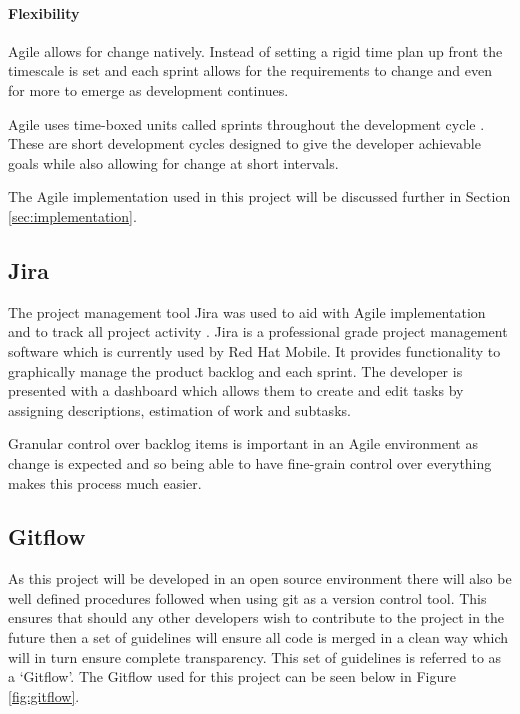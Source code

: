 \paragraph{Flexibility} Agile allows for change natively. Instead of setting a rigid time plan up front the timescale is set and each \gls{sprint} allows for the requirements to change and even for more to emerge as development continues.

Agile uses time-boxed units called \glspl{sprint} throughout the development cycle \citep{Agile2016}. These are short development cycles designed to give the developer achievable goals while also allowing for change at short intervals.

The Agile implementation used in this project will be discussed further in Section \ref{sec:implementation}.

\subsection{Jira}
\label{sub:jira}
The project management tool Jira was used to aid with Agile implementation and to track all project activity \citep{JBoss2016}. Jira is a professional grade project management software which is currently used by Red Hat Mobile. It provides functionality to graphically manage the product backlog and each \gls{sprint}. The developer is presented with a dashboard which allows them to create and edit tasks by assigning descriptions, estimation of work and subtasks.

Granular control over backlog items is important in an Agile environment as change is expected and so being able to have fine-grain control over everything makes this process much easier.
\subsection{Gitflow}
\label{sub:gitflow}
As this project will be developed in an open source environment there will also be well defined procedures followed when using \gls{git} as a version control tool. This ensures that should any other developers wish to contribute to the project in the future then a set of guidelines will ensure all code is merged in a clean way which will in turn ensure complete transparency. This set of guidelines is referred to as a `Gitflow'. The Gitflow used for this project can be seen below in Figure \ref{fig:gitflow}.

